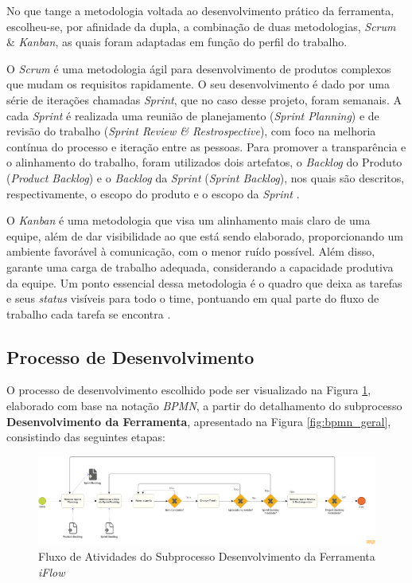 No que tange a metodologia voltada ao desenvolvimento prático da ferramenta, escolheu-se, por afinidade da dupla, a combinação de duas metodologias, \textit{Scrum} \& \textit{Kanban}, as quais foram adaptadas em função do perfil do trabalho.

O \textit{Scrum} é uma metodologia ágil para desenvolvimento de produtos complexos que mudam os requisitos rapidamente. O seu desenvolvimento é dado por uma série de iterações chamadas \textit{Sprint}, que no caso desse projeto, foram semanais. A cada \textit{Sprint} é realizada uma reunião de planejamento (\textit{Sprint Planning}) e de revisão do trabalho (\textit{Sprint Review \& Restrospective}), com foco na melhoria contínua do processo e iteração entre as pessoas. Para promover a transparência e o alinhamento do trabalho, foram utilizados dois artefatos, o \textit{Backlog} do Produto (\textit{Product Backlog}) e o \textit{Backlog} da \textit{Sprint} (\textit{Sprint Backlog}), nos quais  são descritos, respectivamente, o
escopo do produto e o escopo da \textit{Sprint} \cite{carolipaulo2021}.

O \textit{Kanban} é uma metodologia que visa um alinhamento mais claro de uma equipe, além de dar visibilidade ao que está sendo elaborado, proporcionando um ambiente favorável à comunicação, com o menor ruído possível. Além disso, garante uma carga de trabalho adequada, considerando a capacidade produtiva da equipe. Um ponto essencial dessa metodologia é o quadro que deixa as tarefas e seus \textit{status} visíveis para todo o time, pontuando em qual parte do fluxo de trabalho cada tarefa se encontra \cite{K_Condensed}.

\subsection{Processo de Desenvolvimento}

\label{sec:met_dev}

O processo de desenvolvimento escolhido pode ser visualizado na Figura \ref{fig:bpmn_dev}, elaborado com base na notação \textit{BPMN},  a partir do detalhamento do subprocesso \textbf{Desenvolvimento da Ferramenta}, apresentado na Figura \ref{fig:bpmn_geral}, consistindo das seguintes etapas:

\begin{figure}[H]
    \begin{center}
        \caption{Fluxo de Atividades do Subprocesso Desenvolvimento da Ferramenta \textit{iFlow}}
        \label{fig:bpmn_dev}
        \includegraphics[scale=0.23]{figuras/Metodologia/bpmn_dev.png}
    \end{center}
\end{figure}

